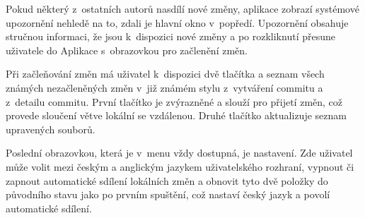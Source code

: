 Pokud některý z~ostatních autorů nasdílí nové změny, aplikace zobrazí systémové upozornění nehledě na to, zdali je hlavní okno v~popředí. Upozornění obsahuje stručnou informaci, že jsou k~dispozici nové změny a po rozkliknutí přesune uživatele do Aplikace s~obrazovkou pro začlenění změn.

Při začleňování změn má uživatel k~dispozici dvě tlačítka a seznam všech známých nezačleněných změn v~již známém stylu z~vytváření commitu a z~detailu commitu. První tlačítko je zvýrazněné a slouží pro přijetí změn, což provede sloučení větve lokální se vzdálenou. Druhé tlačítko aktualizuje seznam upravených souborů.

Poslední obrazovkou, která je v~menu vždy dostupná, je nastavení. Zde uživatel může volit mezi českým a anglickým jazykem uživatelského rozhraní, vypnout či zapnout automatické sdílení lokálních změn a obnovit tyto dvě položky do původního stavu jako po prvním spuštění, což nastaví český jazyk a povolí automatické sdílení.
